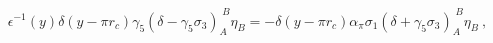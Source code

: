\begin{equation} \label{warunkibrzegbaggerflip}
  \epsilon^{-1}(y) \delta(y-\pi r_c) \gamma_5(\delta-\gamma_5\sigma_3)_A^{\;B}\eta_B=-\delta(y-\pi r_c)\alpha_{\pi}\sigma_1(\delta+\gamma_{5}\sigma_3)_A^{\;B}\eta_B\ ,
      \end{equation} 

